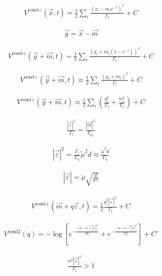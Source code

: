 \documentclass[11pt,a4paper]{article}
\begin{document}
\begin{align}
V^{\text{cond}+}(\vec{x}, t) = \frac{1}{2}\sum_i \frac{(x_i - m_i e^{-t})^2}{\Gamma_t} + C
\end{align}

\begin{align}
\vec{y} = \vec{x} - \vec{m}
\end{align}

\begin{align}
V^{\text{cond}+}(\vec{y} + \vec{m}, t) = \frac{1}{2}\sum_i \frac{(y_i + m_i(1-e^{-t}))^2}{\Gamma_t} + C
\end{align}

\begin{align}
V^{\text{cond}+}(\vec{y} + \vec{m}, t) \approx \frac{1}{2}\sum_i \frac{(y_i + m_i)^2}{\Gamma_t} + C
\end{align}

\begin{align}
V^{\text{cond}+}(\vec{y} + \vec{m}, t) \approx \frac{1}{2}\sum_i \left(\frac{y_i^2}{\Gamma_t} + \frac{m_i^2}{\Gamma_t}\right) + C
\end{align}

\begin{align}
\frac{|\vec{\varepsilon}|^2}{\Gamma_t} = \frac{|\vec{m}|^2}{\Gamma_{t_0}}
\end{align}

\begin{align}
|\vec{\varepsilon}|^2 = \frac{\Gamma_t}{\Gamma_{t_0}} \tilde{\mu}^2 d \approx \frac{\tilde{\mu}^2 d}{\Gamma_{t_0}}
\end{align}

\begin{align}
|\vec{\varepsilon}| = \tilde{\mu}\sqrt{\frac{d}{\sigma^2}}
\end{align}

\begin{align}
V^{\text{cond}+}(\vec{m} + q\vec{\varepsilon}, t) = \frac{1}{2}\frac{q^2|\vec{\varepsilon}|^2}{\Gamma_t} + C
\end{align}

\begin{align}
V^{\text{cond}2}(q) = -\log\left[e^{-\frac{(q-\alpha)^2|\vec{\varepsilon}|^2}{2\Gamma_t}} + e^{-\frac{(q+\alpha)^2|\vec{\varepsilon}|^2}{2\Gamma_t}}\right] + C'
\end{align}

\begin{align}
\frac{\alpha^2|\vec{\varepsilon}|^2}{\Gamma_t} > 1
\end{align}
\end{document}
